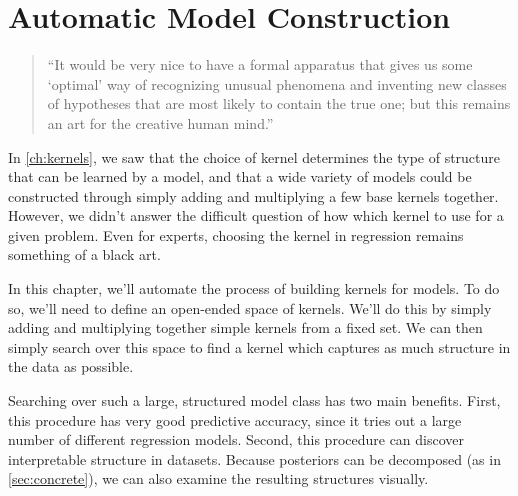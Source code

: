 
\inbpdocument


\chapter{Automatic Model Construction}%
\label{ch:grammar}

\begin{quotation}
``It would be very nice to have a formal apparatus that gives us some `optimal' way of recognizing unusual phenomena and inventing new classes of hypotheses that are most likely to contain the true one; but this remains an art for the creative human mind.''

\hspace*{\fill}
\end{quotation}


In \cref{ch:kernels}, we saw that the choice of kernel determines the type of structure that can be learned by a \gp{} model, and that a wide variety of models could be constructed through simply adding and multiplying a few base kernels together.
However, we didn't answer the difficult question of how which kernel to use for a given problem.
Even for experts, choosing the kernel in \gp{} regression remains something of a black art.

In this chapter, we'll automate the process of building kernels for \gp{} models.
To do so, we'll need to define an open-ended space of kernels.
We'll do this by simply adding and multiplying together simple kernels from a fixed set.
We can then simply search over this space to find a kernel which captures as much structure in the data as possible.

Searching over such a large, structured model class has two main benefits.
First, this procedure has very good predictive accuracy, since it tries out a large number of different regression models.
Second, this procedure can discover interpretable structure in datasets.
Because \gp{} posteriors can be decomposed (as in \cref{sec:concrete}), we can also examine the resulting structures visually.

